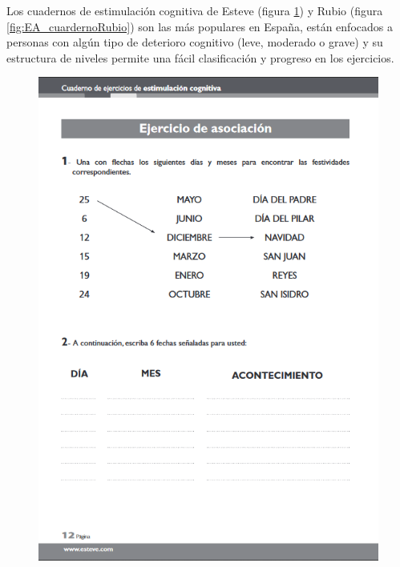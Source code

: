 Los cuadernos de estimulación cognitiva de Esteve (figura \ref{fig:EA_cuadernoEsteve}) y Rubio (figura \ref{fig:EA_cuardernoRubio}) son las más populares en España, están enfocados a personas con algún tipo de deterioro cognitivo (leve, moderado o grave) y su estructura de niveles permite una fácil clasificación y progreso en los ejercicios. \cite{EA_ent_esteve}






\begin{figure}[H]
\centering
\begin{minipage}{.5\textwidth}
  \centering
  \includegraphics[width=.7\linewidth]{03.EstudioProblema/01.EstadoArte/00.Figuras/02.cuaderno_esteve.png}
  \label{fig:EA_cuadernoEsteve}
\end{minipage}%
\begin{minipage}{.5\textwidth}
  \centering

\end{minipage}
\end{figure}
